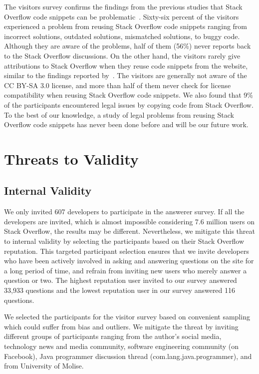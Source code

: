 \documentclass{svjour3}                     %
\begin{document}
The visitors survey confirms the findings from the previous studies that Stack
Overflow code snippets can be problematic~\citep{Acar2016,An2017}. Sixty-six
percent of the visitors experienced a problem from reusing Stack Overflow code
snippets ranging from incorrect solutions, outdated solutions, mismatched
solutions, to buggy code. Although they are aware of the problems, half of them
(56\%) never reports back to the Stack Overflow discussions. On the other hand,
the visitors rarely give attributions to Stack Overflow when they reuse code
snippets from the website, similar to the findings reported
by~\cite{Baltes2017}. The visitors are generally not aware of the CC BY-SA 3.0
license, and more than half of them never check for license compatibility when
reusing Stack Overflow code snippets. We also found that 9\% of the participants
encountered legal issues by copying code from Stack Overflow. To the best of our
knowledge, a study of legal problems from reusing Stack Overflow code snippets
has never been done before and will be our future work.


\section{Threats to Validity}

\subsection{Internal Validity}
We only invited 607
developers to participate in the answerer survey. If all the developers are
invited, which is almost impossible considering 7.6 million users on Stack
Overflow, the results may be different. Nevertheless, we mitigate this threat to
internal validity by selecting the participants based on their Stack Overflow
reputation. This targeted participant selection ensures that we
invite developers who have been actively involved in asking and answering
questions on the site for a long period of time, and refrain from inviting new
users who merely answer a question or two. The highest reputation user invited
to our survey answered 33,933 questions and the lowest reputation user in our
survey answered 116 questions.

We selected the participants for the visitor survey based on convenient sampling
which could suffer from bias and outliers. We mitigate the threat by inviting
different groups of participants ranging from the author's social media,
technology news and media community, software engineering community (on
Facebook), Java programmer discussion thread (com.lang.java.programmer), and
from University of Molise.
\end{document}
